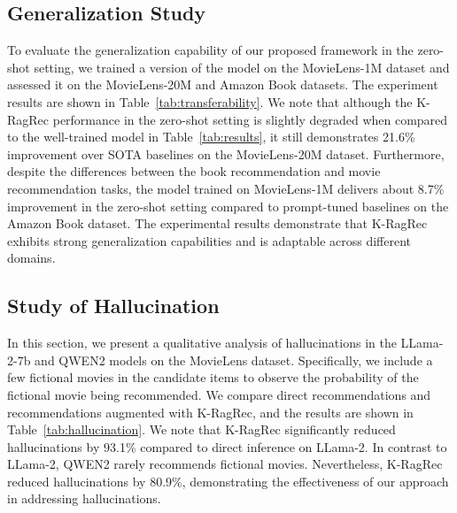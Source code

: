 \subsection{\textbf{Generalization Study}}\label{appendix:General}
To evaluate the generalization capability of our proposed framework in the zero-shot setting, we trained a version of the model on the MovieLens-1M dataset and assessed it on the MovieLens-20M and Amazon Book datasets. The experiment results are shown in Table~\ref{tab:transferability}. 
We note that although the K-RagRec performance in the zero-shot setting is slightly degraded when compared to the well-trained model in Table~\ref{tab:results},  it still demonstrates 21.6\% improvement over SOTA baselines on the MovieLens-20M dataset. 
Furthermore, despite the differences between the book recommendation and movie recommendation tasks, the model trained on MovieLens-1M delivers about 8.7\% improvement in the zero-shot setting compared to prompt-tuned baselines on the Amazon Book dataset.
The experimental results demonstrate that K-RagRec exhibits strong generalization capabilities and is adaptable across different domains.






\subsection{Study of Hallucination}
In this section, we present a qualitative analysis of hallucinations in the LLama-2-7b and QWEN2 models on the MovieLens dataset. Specifically, we include a few fictional movies in the candidate items to observe the probability of the fictional movie being recommended. We compare direct recommendations and recommendations augmented with K-RagRec, and the results are shown in Table~\ref{tab:hallucination}. We note that K-RagRec significantly reduced hallucinations by 93.1\% compared to direct inference on LLama-2. In contrast to LLama-2, QWEN2 rarely recommends fictional movies. Nevertheless, K-RagRec reduced hallucinations by 80.9\%, demonstrating the effectiveness of our approach in addressing hallucinations.





